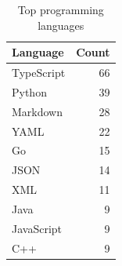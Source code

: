 \begin{table}
\caption{Top programming languages}
\label{tab:language-distribution}
\begin{tabular}{lr}
\toprule
Language & Count \\
\midrule
TypeScript & 66 \\
Python & 39 \\
Markdown & 28 \\
YAML & 22 \\
Go & 15 \\
JSON & 14 \\
XML & 11 \\
Java & 9 \\
JavaScript & 9 \\
C++ & 9 \\
\bottomrule
\end{tabular}
\end{table}
